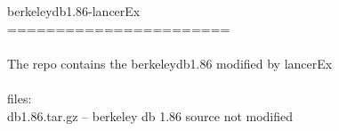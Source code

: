 \documentclass[12pt,a4paper]{article}
\begin{document}
berkeleydb1.86-lancerEx	\\
=======================	\\
	\\
The repo contains the berkeleydb1.86 modified by lancerEx	\\
	\\
files:	\\
db1.86.tar.gz	--	berkeley db 1.86 source not modified	\\
\end{document}
